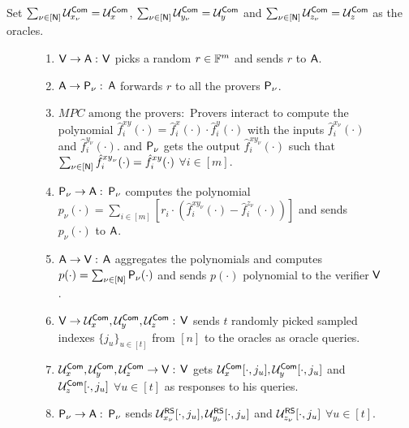Set $\sum_{\nu \in [\mathsf{N}]} \mathcal{U}^{\mathsf{Com}}_{x_{\nu}} = \mathcal{U}^{\mathsf{Com}}_x$, $\sum_{\nu \in [\mathsf{N}]} \mathcal{U}^{\mathsf{Com}}_{y_{\nu}} = \mathcal{U}^{\mathsf{Com}}_y$ and $\sum_{\nu \in [\mathsf{N}]} \mathcal{U}^{\mathsf{Com}}_{z_{\nu}} = \mathcal{U}^{\mathsf{Com}}_z$ as the oracles.
\begin{figure}[h!]
	\begin{framed}
		\begin{enumerate}
			\item $\mathsf{V} \rightarrow \mathsf{A} : $ $\mathsf{V}$ picks a random $r\in \mathbb{F}^m$ and sends $r$ to $\mathsf{A}$.
	
			\item $\mathsf{A} \rightarrow \mathsf{P}_{\nu} : $ $\mathsf{A}$ forwards $r$ to all the provers $\mathsf{P}_{\nu}$.
			
			\item $MPC\text{ among the provers}: $ Provers interact to compute the polynomial $\hat{f}^{xy}_i(\cdot) = \hat{f}^{x}_i(\cdot)\cdot\hat{f}^{y}_i(\cdot)$ with the inputs $\hat{f}^{x_{\nu}}_i(\cdot)$ and $\hat{f}^{y_{\nu}}_i(\cdot)$. and $\mathsf{P}_{\nu}$ gets the output $\hat{f}^{{xy}_{\nu}}_i(\cdot)$ such that $\sum_{\nu \in [\mathsf{N}]} \hat{f}^{{xy}_{\nu}}_i(\cdot) = \hat{f}^{xy}_i(\cdot)$ $\forall i\in [m]$.
			
			\item $\mathsf{P}_{\nu} \rightarrow \mathsf{A} : $ $\mathsf{P}_{\nu}$ computes the polynomial $p_{\nu}(\cdot) = \sum_{i\in [m]} [r_i \cdot (\hat{f}^{{xy}_{\nu}}_i(\cdot)  - \hat{f}^{z_{\nu}}_i(\cdot))]$ and sends $p_{\nu}(\cdot)$ to $\mathsf{A}$.
	
			\item $\mathsf{A} \rightarrow \mathsf{V} : $ $\mathsf{A}$ aggregates the polynomials and computes $p(\cdot) = \sum_{\nu \in [\mathsf{N}]} \mathsf{P}_{\nu}(\cdot)$ and sends $p(\cdot)$ polynomial to the verifier $\mathsf{V}$.
	
			\item $\mathsf{V} \rightarrow \mathcal{U}^{\mathsf{Com}}_{x}, \mathcal{U}^{\mathsf{Com}}_{y}, \mathcal{U}^{\mathsf{Com}}_{z} : $ $\mathsf{V}$ sends $t$ randomly picked sampled indexes $\{j_u\}_{u\in[t]}$ from $[n]$ to the oracles as oracle queries.
			
			\item $\mathcal{U}^{\mathsf{Com}}_{x}, \mathcal{U}^{\mathsf{Com}}_{y}, \mathcal{U}^{\mathsf{Com}}_{z} \rightarrow \mathsf{V} : $ $\mathsf{V}$ gets $\mathcal{U}^{\mathsf{Com}}_{x}[\cdot, j_u], \mathcal{U}^{\mathsf{Com}}_{y}[\cdot, j_u]$ and $\mathcal{U}^{\mathsf{Com}}_{z}[\cdot, j_u]$ $\forall u\in[t]$ as responses to his queries.
			
			\item $\mathsf{P}_{\nu} \rightarrow \mathsf{A} : $ $\mathsf{P}_{\nu}$ sends $\mathcal{U}^{\mathsf{RS}}_{x_{\nu}}[\cdot, j_u], \mathcal{U}^{\mathsf{RS}}_{y_{\nu}}[\cdot, j_u]$ and $\mathcal{U}^{\mathsf{RS}}_{z_{\nu}}[\cdot,j_u]$ $\forall u\in[t]$.
	

\end{enumerate}
\end{framed}
\end{figure}
